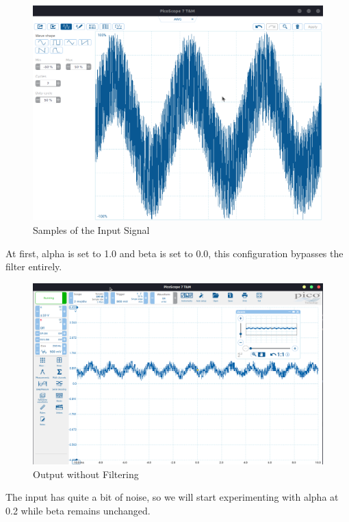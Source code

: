 \begin{figure}[H]
    \centering
    \includegraphics[width=150mm, keepaspectratio]{figures/sine-with-error.png}
    \caption{Samples of the Input Signal}
    \label{fig:sine-with-error}
\end{figure}

At first, alpha is set to 1.0 and beta is set to 0.0, this configuration bypasses the filter entirely.

\begin{figure}[H]
    \centering
    \includegraphics[width=150mm, keepaspectratio]{figures/bypass.png}
    \caption{Output without Filtering}
    \label{fig:bypass}
\end{figure}

The input has quite a bit of noise, so we will start experimenting with alpha at 0.2 while beta remains unchanged.

